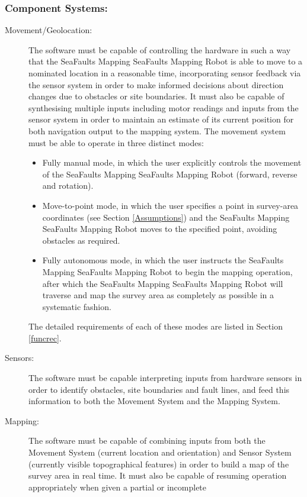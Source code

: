 \documentclass[12pt]{article}
\begin{document}
\subsubsection{Component Systems:}\label{primarysystems}
\begin{description}
\item [{Movement/Geolocation:}] The software must be capable of controlling
the hardware in such a way that the SeaFaults Mapping SeaFaults Mapping Robot is able to move to a nominated
location in a reasonable time, incorporating sensor feedback via the
sensor system in order to make informed decisions about direction
changes due to obstacles or site boundaries. It must also be capable
of synthesising multiple inputs including motor readings and inputs
from the sensor system in order to maintain an estimate of its current
position for both navigation output to the mapping system. 
The movement system must be able to operate in three distinct modes:
\begin{itemize}{}
\item Fully manual mode, in which the user explicitly controls the movement of the SeaFaults Mapping SeaFaults Mapping Robot (forward, reverse and rotation).
\item Move-to-point mode, in which the user specifies a point in survey-area coordinates (see Section \ref{Assumptions}) and the SeaFaults Mapping SeaFaults Mapping Robot moves to the specified point, avoiding obstacles as required. 
\item Fully autonomous mode, in which the user instructs the SeaFaults Mapping SeaFaults Mapping Robot to begin the mapping operation, after which the SeaFaults Mapping SeaFaults Mapping Robot will traverse and map the survey area as completely as possible in a systematic fashion.
\end{itemize}
The detailed requirements of each of these modes are listed in Section \ref{funcrec}.
\item [{Sensors:}] The software must be capable interpreting inputs from
hardware sensors in order to identify obstacles, site boundaries and
fault lines, and feed this information to both the Movement System
and the Mapping System.
\item [{Mapping:}] The software must be capable of combining inputs from
both the Movement System (current location and orientation) and Sensor
System (currently visible topographical features) in order to build
a map of the survey area in real time. It must also be capable
of resuming operation appropriately when given a partial or incomplete

\end{description}
\end{document}
